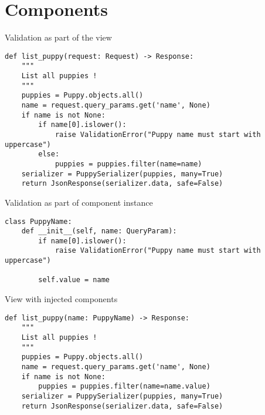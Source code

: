 \section{Components}
\begin{frame}[fragile]{Validation as part of the view}
    \begin{verbatim}
def list_puppy(request: Request) -> Response:
    """
    List all puppies !
    """
    puppies = Puppy.objects.all()
    name = request.query_params.get('name', None)
    if name is not None:
        if name[0].islower():
            raise ValidationError("Puppy name must start with uppercase")
        else:
            puppies = puppies.filter(name=name)
    serializer = PuppySerializer(puppies, many=True)
    return JsonResponse(serializer.data, safe=False)
    \end{verbatim}
\end{frame}

\begin{frame}[fragile]{Validation as part of component instance}
    \begin{verbatim}
class PuppyName:
    def __init__(self, name: QueryParam):
        if name[0].islower():
            raise ValidationError("Puppy name must start with uppercase")

        self.value = name
    \end{verbatim}
\end{frame}

\begin{frame}[fragile]{View with injected components}
    \begin{verbatim}
def list_puppy(name: PuppyName) -> Response:
    """
    List all puppies !
    """
    puppies = Puppy.objects.all()
    name = request.query_params.get('name', None)
    if name is not None:
        puppies = puppies.filter(name=name.value)
    serializer = PuppySerializer(puppies, many=True)
    return JsonResponse(serializer.data, safe=False)
    \end{verbatim}
\end{frame}
